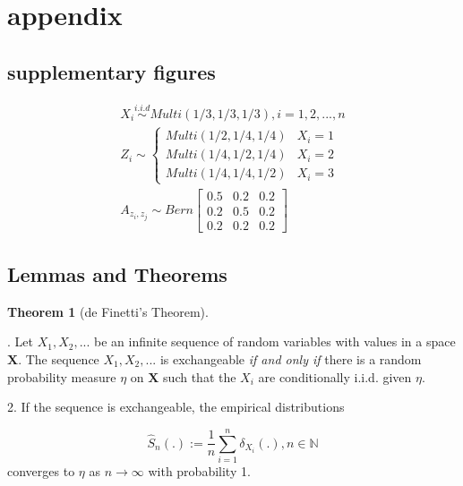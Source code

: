 \documentclass[12pt]{article}
\theoremstyle{definition}
\newtheorem{theorem}{Theorem}[section]
\begin{document}
	
\appendix
\section{appendix}
	
\subsection{supplementary figures}

\begin{equation}
\begin{gathered}
	X_{i} \overset{i.i.d}{\sim} Multi(1/3, 1/3, 1/3), i = 1,2, ... , n \\ 
	Z_{i}  \sim  \left\{  \begin{array}{ccc} Multi(1/2, 1/4, 1/4) & X_{i} = 1 \\ Multi(1/4, 1/2, 1/4) & X_{i} = 2 \\ Multi(1/4, 1/4, 1/2) & X_{i} = 3  \end{array} \right. \\
	A_{z_{i}, z_{j}} \sim Bern \left[  \begin{array}{ccc}   0.5 & 0.2 &  0.2  \\ 0.2 & 0.5 & 0. 2  \\ 0.2 & 0.2 & 0.2  \end{array}  \right]
\end{gathered}
\end{equation}
	
	
	
\subsection{Lemmas and Theorems}
	
\begin{theorem}[de Finetti's Theorem] 
	\label{finetti}
	
. Let $X_{1}, X_{2}, ...$ be an infinite sequence of random variables with values in a space $\mathbf{X}$. The sequence $X_{1}, X_{2}, ...$ is exchangeable \textit{if and only if} there is a random probability measure $\eta$ on $\mathbf{X}$ such that the $X_{i}$ are conditionally i.i.d. given $\eta$. 
		
2. If the sequence is exchangeable, the empirical distributions
		
$$\hat{S}_{n} ( . ) := \frac{1}{n} \sum\limits_{i=1}^{n} \delta_{X_{i}} ( .), n \in \mathbb{N}$$
		converges to $\eta$ as $n \rightarrow \infty$ with probability 1.
\end{theorem}
	
\end{document}
